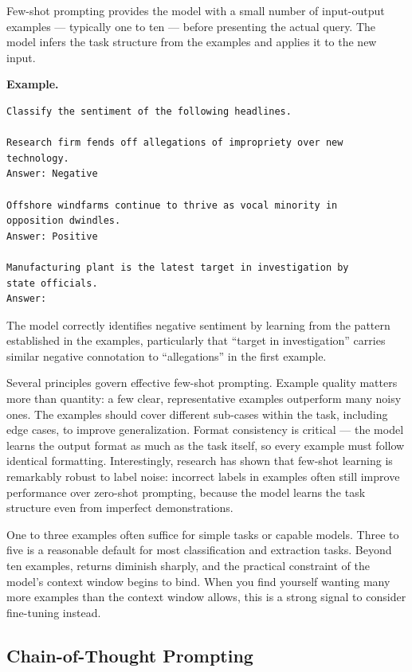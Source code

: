 \documentclass{book}
\begin{document}
Few-shot prompting provides the model with a small number of
input-output examples --- typically one to ten --- before presenting the
actual query. The model infers the task structure from the examples and
applies it to the new input.

\textbf{Example.}
\begin{verbatim}
Classify the sentiment of the following headlines.

Research firm fends off allegations of impropriety over new
technology.
Answer: Negative

Offshore windfarms continue to thrive as vocal minority in
opposition dwindles.
Answer: Positive

Manufacturing plant is the latest target in investigation by
state officials.
Answer:
\end{verbatim}

The model correctly identifies negative sentiment by learning from the
pattern established in the examples, particularly that ``target in
investigation'' carries similar negative connotation to ``allegations''
in the first example.

Several principles govern effective few-shot prompting. Example quality
matters more than quantity: a few clear, representative examples outperform
many noisy ones. The examples should cover different sub-cases within the
task, including edge cases, to improve generalization. Format consistency
is critical --- the model learns the output format as much as the task
itself, so every example must follow identical formatting. Interestingly,
research has shown that few-shot learning is remarkably robust to label
noise: incorrect labels in examples often still improve performance over
zero-shot prompting, because the model learns the task structure even from
imperfect demonstrations.

One to three examples often suffice for simple tasks or capable models.
Three to five is a reasonable default for most classification and extraction
tasks. Beyond ten examples, returns diminish sharply, and the practical
constraint of the model's context window begins to bind. When you find
yourself wanting many more examples than the context window allows, this
is a strong signal to consider fine-tuning instead.

\subsection{Chain-of-Thought Prompting}
\label{sec:cot}
\end{document}
